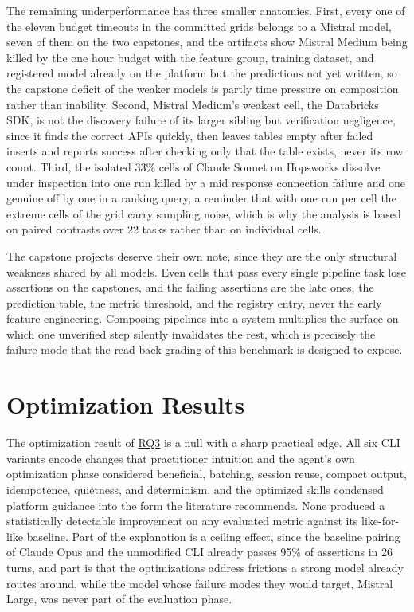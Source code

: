 \documentclass[
english,                 %
bibtex,                  %
]{kththesis}
\numberwithin{listing}{chapter}
\begin{document}
The remaining underperformance has three smaller anatomies. First, every one of the eleven budget timeouts in the committed grids belongs to a Mistral model, seven of them on the two capstones, and the artifacts show Mistral Medium being killed by the one hour budget with the feature group, training dataset, and registered model already on the platform but the predictions not yet written, so the capstone deficit of the weaker models is partly time pressure on composition rather than inability. Second, Mistral Medium's weakest cell, the Databricks \gls{SDK}, is not the discovery failure of its larger sibling but verification negligence, since it finds the correct \glspl{API} quickly, then leaves tables empty after failed inserts and reports success after checking only that the table exists, never its row count. Third, the isolated 33\% cells of Claude Sonnet on Hopsworks dissolve under inspection into one run killed by a mid response connection failure and one genuine off by one in a ranking query, a reminder that with one run per cell the extreme cells of the grid carry sampling noise, which is why the analysis is based on paired contrasts over 22 tasks rather than on individual cells.

The capstone projects deserve their own note, since they are the only structural weakness shared by all models. Even cells that pass every single pipeline task lose assertions on the capstones, and the failing assertions are the late ones, the prediction table, the metric threshold, and the registry entry, never the early feature engineering. Composing pipelines into a system multiplies the surface on which one unverified step silently invalidates the rest, which is precisely the failure mode that the read back grading of this benchmark is designed to expose.

\section{Optimization Results}
\label{sec:disc_optimization_results}
\glsresetall

The optimization result of \hyperref[rq3]{RQ3} is a null with a sharp practical edge. All six \gls{CLI} variants encode changes that practitioner intuition and the agent's own optimization phase considered beneficial, batching, session reuse, compact output, idempotence, quietness, and determinism, and the optimized skills condensed platform guidance into the form the literature recommends. None produced a statistically detectable improvement on any evaluated metric against its like-for-like baseline. Part of the explanation is a ceiling effect, since the baseline pairing of Claude Opus and the unmodified \gls{CLI} already passes 95\% of assertions in 26 turns, and part is that the optimizations address frictions a strong model already routes around, while the model whose failure modes they would target, Mistral Large, was never part of the evaluation phase.
\end{document}
